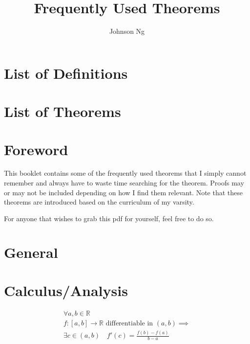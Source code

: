 \documentclass[11pt, oneside]{book}
\title{Frequently Used Theorems}
\author{Johnson Ng}
\begin{document}
\hypersetup{pageanchor=false}
\maketitle
\hypersetup{pageanchor=true}
\tableofcontents

\chapter*{List of Definitions}

\chapter*{List of Theorems}

\chapter*{Foreword}
  \label{chapter:foreword}

This booklet contains some of the frequently used theorems that I simply cannot remember and always have to waste time searching for the theorem. Proofs may or may not be included depending on how I find them relevant. Note that these theorems are introduced based on the curriculum of my varsity.

For anyone that wishes to grab this pdf for yourself, feel free to do so.


\chapter{General}
  \label{chapter:general}




\chapter{Calculus/Analysis}
  \label{chapter:calculus/Analysis}

\begin{thm}\label{thm:mean_value_theorem}
   \begin{gather*}
     \forall a, b \in \mathbb{R} \\
     f: [a, b] \to \mathbb{R} \text{ differentiable in } (a, b) \implies \\
     \exists c \in (a, b) \quad f'(c) = \frac{f(b) - f(a)}{b - a} 
   \end{gather*}
\end{thm}

\end{document}
